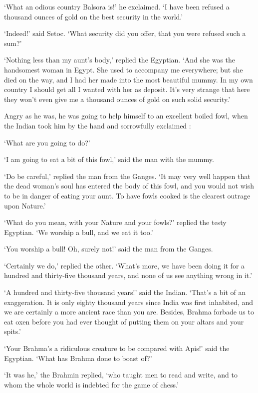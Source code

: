 \documentclass{article}
\begin{document}
\begin{center}
`What an odious country Balsora is!' he exclaimed. `I have been refused a thousand 
ounces of gold on the best security in the world.' 

`Indeed!' said Setoc. `What security did you offer, that you were refused such 
a sum?' 

`Nothing less than my aunt's body,' replied the Egyptian. `And she was the handsomest 
woman in Egypt. She used to accompany me everywhere; but she died on the way, and 
I had her made into the most beautiful mummy. In my own country I should get all 
I wanted with her as deposit. It's very strange that here they won't even give 
me a thousand ounces of gold on such solid security.' 

Angry as he was, he was going to help himself to an excellent boiled fowl, when 
the Indian took him by the hand and sorrowfully exclaimed : 

`What are you going to do?' 

`I am going to eat a bit of this fowl,' said the man with the mummy. 

`Do be careful,' replied the man from the Ganges. `It may very well happen that 
the dead woman's soul has entered the body of this fowl, and you would not wish 
to be in danger of eating your aunt. To have fowls cooked is the clearest outrage 
upon Nature.' 

`What do you mean, with your Nature and your fowls?' replied the testy Egyptian. 
`We worship a bull, and we eat it too.' 

`You worship a bull! Oh, surely not!' said the man from the Ganges. 

`Certainly we do,' replied the other. `What's more, we have been doing it for a 
hundred and thirty-five thousand years, and none of us see anything wrong in it.' 

`A hundred and thirty-five thousand years!' said the Indian. `That's a bit of an 
exaggeration. It is only eighty thousand years since India was first inhabited, 
and we are certainly a more ancient race than you are. Besides, Brahma forbade 
us to eat oxen before you had ever thought of putting them on your altars and your 
spits.' 

`Your Brahma's a ridiculous creature to be compared with Apis!' said the Egyptian. 
`What has Brahma done to boast of?' 

`It was he,' the Brahmin replied, `who taught men to read and write, and to whom 
the whole world is indebted for the game of chess.' 


\end{center}
\end{document}
